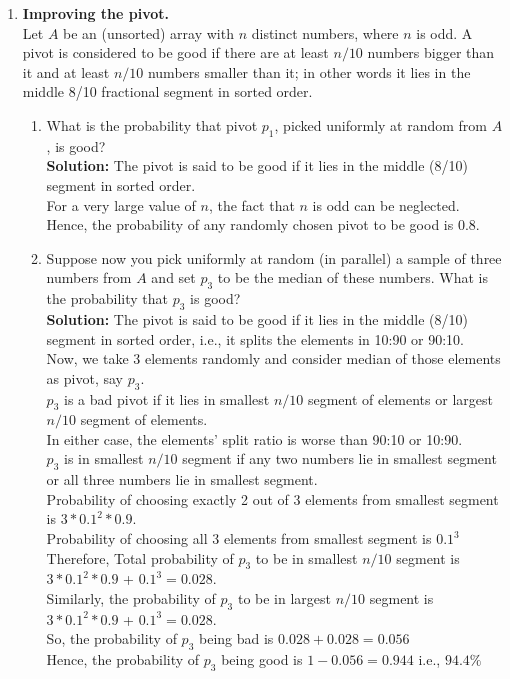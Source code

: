 \documentclass[12pt]{article}
\begin{document}
\begin{enumerate}
\begin{enumerate}
\end{enumerate}
\pagebreak
\item \textbf{Improving the pivot.}\\
Let $A$ be an (unsorted) array with $n$ distinct numbers, where $n$ is odd. A pivot is considered to be good if there are at least $n/10$ numbers bigger than it and at least $n/10$ numbers smaller than it; in other words it lies in the middle 8/10 fractional segment in sorted order.
\begin{enumerate}
\item What is the probability that pivot $p_1$, picked uniformly at random from $A$, is good?\\
\textbf{Solution:} The pivot is said to be good if it lies in the middle (8/10) segment in sorted order.\\
For a very large value of $n$, the fact that $n$ is odd can be neglected.\\
Hence, the probability of any randomly chosen pivot to be good is 0.8.
\item Suppose now you pick uniformly at random (in parallel) a sample of three numbers from $A$ and set $p_3$ to be the median of these numbers. What is the probability that $p_3$ is good?\\
\textbf{Solution:} The pivot is said to be good if it lies in the middle (8/10) segment in sorted order, i.e., it splits the elements in 10:90 or 90:10.\\
Now, we take 3 elements randomly and consider median of those elements as pivot, say $p_3$.\\
$p_3$ is a bad pivot if it lies in smallest $n/10$ segment of elements or largest $n/10$ segment of elements.\\
In either case, the elements' split ratio is worse than 90:10 or 10:90.\\
$p_3$ is in smallest $n/10$ segment if any two numbers lie in smallest segment or all three numbers lie in smallest segment.\\
Probability of choosing exactly 2 out of 3 elements from smallest segment is $3*0.1^2*0.9$.\\
Probability of choosing all 3 elements from smallest segment is $0.1^3$\\
Therefore, Total probability of $p_3$ to be in smallest $n/10$ segment is $3*0.1^2*0.9$ + $0.1^3 = 0.028$.\\
Similarly, the probability of $p_3$ to be in largest $n/10$ segment is $3*0.1^2*0.9$ + $0.1^3 = 0.028$.\\
So, the probability of $p_3$ being bad is $0.028 + 0.028 = 0.056$\\
Hence, the probability of $p_3$ being good is $1- 0.056 = 0.944$ i.e., $94.4\%$\\


\end{enumerate}
\end{enumerate}
\end{document}
